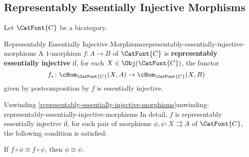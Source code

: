 \subsection{Representably Essentially Injective Morphisms}\label{subsection-representably-essentially-injective-morphisms}
Let $\CatFont{C}$ be a bicategory.
\begin{definition}{Representably Essentially Injective Morphisms}{representably-essentially-injective-morphisms}%
    A $1$-morphism $f\colon A\to B$ of $\CatFont{C}$ is \textbf{representably essentially injective} if, for each $X\in\Obj(\CatFont{C})$, the functor
    \[
        f_{*}%
        \colon%
        \cHom_{\CatFont{C}}(X,A)%
        \to%
        \cHom_{\CatFont{C}}(X,B)%
    \]%
    given by postcomposition by $f$ is essentially injective.
\end{definition}
\begin{remark}{Unwinding \cref{representably-essentially-injective-morphisms}}{unwinding-representably-essentially-injective-morphisms}%
    In detail, $f$ is representably essentially injective if, for each pair of morphisms $\phi,\psi\colon X\rightrightarrows A$ of $\CatFont{C}$, the following condition is satisfied:
    \begin{itemize}
        \itemstar If $f\circ\phi\cong f\circ\psi$, then $\phi\cong\psi$.
    \end{itemize}
\end{remark}
